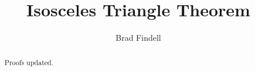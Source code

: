 \documentclass[nooutcomes]{ximera}
\title{Isosceles Triangle Theorem}
\author{Brad Findell}
\begin{document}
\begin{abstract}
Proofs updated. 
\end{abstract}
\maketitle

%
%


\end{document}
